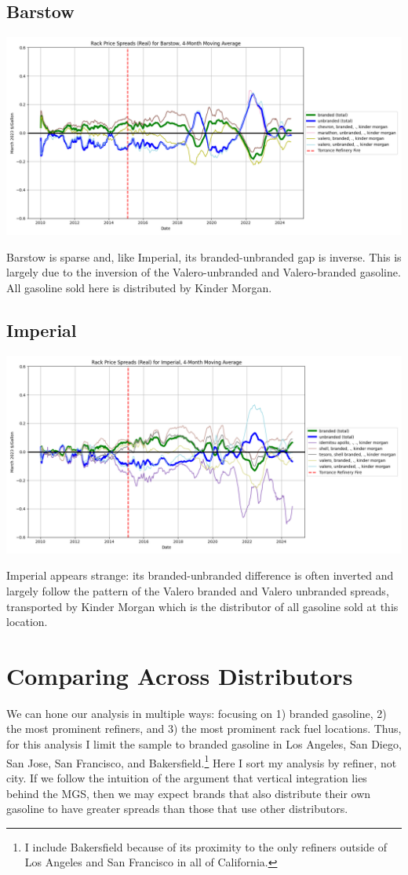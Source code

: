 \documentclass{article}
\begin{document}
\subsection{Barstow} 
\centering \includegraphics[width=5.5in]{barstow_spread.png}\\
\raggedright Barstow is sparse and, like Imperial, its branded-unbranded gap is inverse. This is largely due to the inversion of the Valero-unbranded and Valero-branded gasoline. All gasoline sold here is distributed by Kinder Morgan.

\subsection{Imperial}
\centering \includegraphics[width=5.5in]{imperial_spread.png}\\
\raggedright Imperial appears strange: its branded-unbranded difference is often inverted and largely follow the pattern of the Valero branded and Valero unbranded spreads, transported by Kinder Morgan which is the distributor of all gasoline sold at this location. 

\section{Comparing Across Distributors}
We can hone our analysis in multiple ways: focusing on 1) branded gasoline, 2) the most prominent refiners, and 3) the most prominent rack fuel locations. Thus, for this analysis I limit the sample to branded gasoline in Los Angeles, San Diego, San Jose, San Francisco, and Bakersfield.\footnote{I include Bakersfield because of its proximity to the only refiners outside of Los Angeles and San Francisco in all of California.} Here I sort my analysis by refiner, not city. If we follow the intuition of the argument that vertical integration lies behind the MGS, then we may expect brands that also distribute their own gasoline to have greater spreads than those that use other distributors. 
\end{document}
